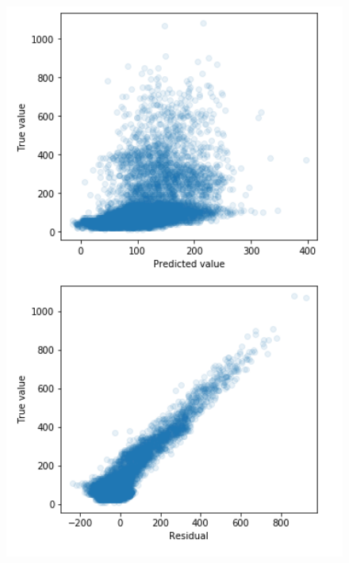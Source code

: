 \documentclass{article}
\begin{document}
\begin{figure}[H]
\centering
\begin{minipage}{0.45\textwidth}
\includegraphics[width=1\textwidth, keepaspectratio]{imgs/linreg-simple.png}
\end{minipage}
%
\begin{minipage}{0.45\textwidth}

\end{minipage}
\end{figure}
\end{document}
